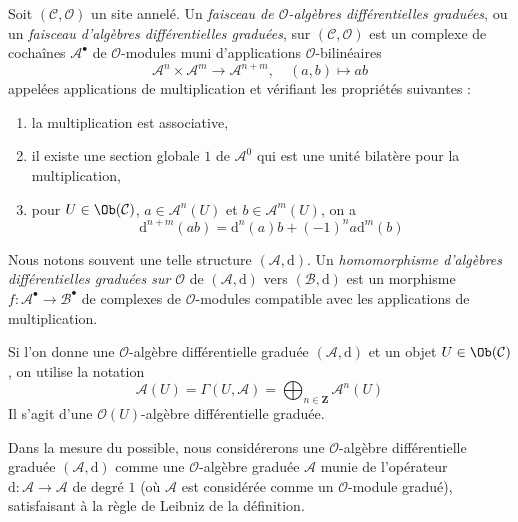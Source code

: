\begin{definition}
\label{definition-dga}
Soit $(\mathcal{C}, \mathcal{O})$ un site annelé.
Un {\it faisceau de $\mathcal{O}$-algèbres différentielles graduées}, ou un {\it faisceau d'algèbres différentielles graduées}, sur $(\mathcal{C}, \mathcal{O})$ est un complexe de cochaînes $\mathcal{A}^\bullet$ de $\mathcal{O}$-modules muni d'applications $\mathcal{O}$-bilinéaires
$$
\mathcal{A}^n \times \mathcal{A}^m \to \mathcal{A}^{n + m},\quad
(a, b) \longmapsto ab
$$
appelées applications de multiplication et vérifiant les propriétés suivantes :
\begin{enumerate}
\item la multiplication est associative,
\item il existe une section globale $1$ de $\mathcal{A}^0$ qui est une unité bilatère pour la multiplication,
\item pour $U \in \Ob(\mathcal{C})$, $a \in \mathcal{A}^n(U)$ et $b \in \mathcal{A}^m(U)$, on a
$$
\text{d}^{n + m}(ab) = \text{d}^n(a)b + (-1)^n a\text{d}^m(b)
$$
\end{enumerate}
Nous notons souvent une telle structure $(\mathcal{A}, \text{d})$.
Un {\it homomorphisme d'algèbres différentielles graduées sur $\mathcal{O}$} de $(\mathcal{A}, \text{d})$ vers $(\mathcal{B}, \text{d})$ est un morphisme $f : \mathcal{A}^\bullet \to \mathcal{B}^\bullet$ de complexes de $\mathcal{O}$-modules compatible avec les applications de multiplication.
\end{definition}

\noindent
Si l'on donne une $\mathcal{O}$-algèbre différentielle graduée $(\mathcal{A}, \text{d})$ et un objet $U \in \Ob(\mathcal{C})$, on utilise la notation
$$
\mathcal{A}(U) =
\Gamma(U, \mathcal{A}) =
\bigoplus\nolimits_{n \in \mathbf{Z}} \mathcal{A}^n(U)
$$
Il s'agit d'une $\mathcal{O}(U)$-algèbre différentielle graduée.

\medskip\noindent
Dans la mesure du possible, nous considérerons une $\mathcal{O}$-algèbre différentielle graduée $(\mathcal{A}, \text{d})$ comme une $\mathcal{O}$-algèbre graduée $\mathcal{A}$ munie de l'opérateur $\text{d} : \mathcal{A} \to \mathcal{A}$ de degré $1$ (où $\mathcal{A}$ est considérée comme un $\mathcal{O}$-module gradué), satisfaisant à la règle de Leibniz de la définition.

